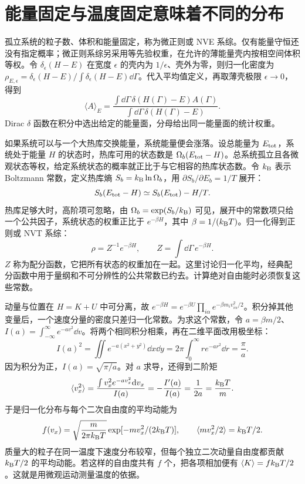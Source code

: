 \section{能量固定与温度固定意味着不同的分布}
孤立系统的粒子数、体积和能量固定，称为微正则或 NVE 系综。仅有能量守恒还没有指定概率；微正则系综另采用等先验权重，在允许的薄能量壳内按相空间体积等权。令 $\delta_\epsilon(H-E)$ 在宽度 $\epsilon$ 的壳内为 $1/\epsilon$、壳外为零，则归一化密度为 $\rho_{E,\epsilon}=\delta_\epsilon(H-E)/\int\delta_\epsilon(H-E)\dd\Gamma$。代入平均值定义，再取薄壳极限 $\epsilon\to0$，得到
\begin{equation}
\langle A\rangle_E=\frac{\int\dd\Gamma\,\delta(H(\Gamma)-E)A(\Gamma)}{\int\dd\Gamma\,\delta(H(\Gamma)-E)}.
\end{equation}
Dirac $\delta$ 函数在积分中选出给定的能量面，分母给出同一能量面的统计权重。

如果系统可以与一个大热库交换能量，系统能量便会涨落。设总能量为 $E_{\rm tot}$，系统处于能量 $H$ 的状态时，热库可用的状态数是 $\Omega_b(E_{\rm tot}-H)$。总系统孤立且各微观状态等权，给定系统状态的概率就正比于与它相容的热库状态数。令 $k_{\mathrm B}$ 表示 Boltzmann 常数，定义热库熵 $S_b=k_{\mathrm B}\ln\Omega_b$，用 $\partial S_b/\partial E_b=1/T$ 展开：
\begin{equation}
S_b(E_{\rm tot}-H)\simeq S_b(E_{\rm tot})-H/T.
\end{equation}
热库足够大时，高阶项可忽略，由 $\Omega_b=\exp(S_b/k_{\mathrm B})$ 可见，展开中的常数项只给一个公共因子，系统状态的权重正比于 $e^{-\beta H}$，其中 $\beta=1/(k_{\mathrm B} T)$。归一化得到正则或 NVT 系综：
\begin{equation}
\rho=Z^{-1}e^{-\beta H},\qquad Z=\int\dd\Gamma\,e^{-\beta H}.
\end{equation}
$Z$ 称为配分函数，它把所有状态的权重加在一起。这里讨论归一化平均，经典配分函数中用于量纲和不可分辨性的公共常数已约去。计算绝对自由能时必须恢复这些常数。

动量与位置在 $H=K+U$ 中可分离，故 $e^{-\beta H}=e^{-\beta U}\prod_{i\alpha}e^{-\beta m_i v_{i\alpha}^2/2}$。积分掉其他变量后，一个速度分量的密度只差归一化常数。为求这个常数，令 $a=\beta m/2$、$I(a)=\int_{-\infty}^{\infty}e^{-av^2}\dd v$。将两个相同积分相乘，再在二维平面改用极坐标：
\begin{equation}
I(a)^2=\iint e^{-a(x^2+y^2)}\dd x\dd y
=2\pi\int_0^\infty r e^{-ar^2}\dd r=\frac\pi a.
\end{equation}
因为积分为正，$I(a)=\sqrt{\pi/a}$。对 $a$ 求导，还得到二阶矩
\begin{equation}
\langle v_x^2\rangle=\frac{\int v_x^2e^{-av_x^2}\mathrm{d} v_x}{I(a)}
=-\frac{I'(a)}{I(a)}=\frac1{2a}=\frac{k_{\mathrm B} T}{m}.
\end{equation}
于是归一化分布与每个二次自由度的平均动能为
\begin{equation}
f(v_x)=\sqrt{\frac{m}{2\pi k_{\mathrm B} T}}\exp[-mv_x^2/(2k_{\mathrm B} T)],\qquad
\langle mv_x^2/2\rangle=k_{\mathrm B} T/2.
\end{equation}
质量大的粒子在同一温度下速度分布较窄，但每个独立二次动量自由度都贡献 $k_{\mathrm B} T/2$ 的平均动能。若这样的自由度共有 $f$ 个，把各项相加便有 $\langle K\rangle=fk_{\mathrm B} T/2$。这就是用微观运动测量温度的依据。

